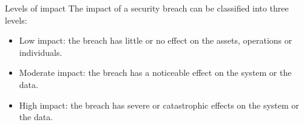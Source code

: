 \begin{section}{Levels of impact}
  The impact of a security breach can be classified into three levels:
  \begin{itemize}
    \item Low impact: the breach has little or no effect on the assets, operations or individuals.
    \item Moderate impact: the breach has a noticeable effect on the system or the data.
    \item High impact: the breach has severe or catastrophic effects on the system or the data.
  \end{itemize}
\end{section}

